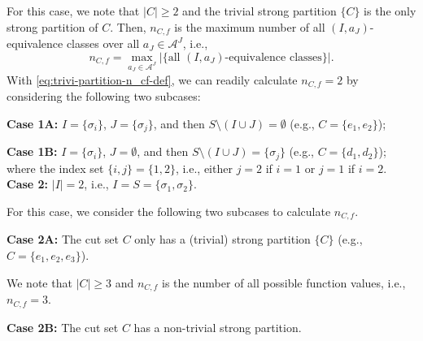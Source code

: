 \documentclass[11pt,draftclsnofoot,onecolumn]{IEEEtran}
\begin{document}
For this case, we note that $|C|\geq 2$ and  the trivial strong partition $\{C\}$ is the only strong partition of $C$.
Then, $n_{C,f}$ is the maximum number of all $(I,a_{J})$-equivalence classes over all $a_{J}\in\mathcal{A}^{J}$, i.e.,
\begin{equation}\label{eq:trivi-partition-n_cf-def}
 n_{C,f}=\max_{a_{J}\in\mathcal{A}^{J}}\big|\big\{\text{all $(I,a_{J})$-equivalence classes}\big\}\big|.
\end{equation}
With \eqref{eq:trivi-partition-n_cf-def}, we can readily calculate  $n_{C,f}=2$ by considering the following   two subcases:

\textbf{Case 1A:} $I=\{\sigma_{i}\}$, $J=\{\sigma_{j}\}$, and then $S\setminus(I\cup J)=\emptyset$ (e.g., $C=\{e_{1},e_{2}\}$);

\textbf{Case 1B:} $I=\{\sigma_{i}\}$, $J=\emptyset$, and then $S\setminus(I\cup J)=\{\sigma_{j}\}$ (e.g., $C=\{d_{1},d_{2}\}$);\\
where the index set $\{i,j\}=\{1,2\}$, i.e., either $j=2$ if $i=1$ or $j=1$ if $i=2$.\\
\textbf{Case 2:} $|I|=2$, i.e., $I=S=\{\sigma_{1},\sigma_{2}\}$.

For this case, we consider the following two subcases to calculate $n_{C,f}$.

\textbf{Case 2A:} The cut set $C$ only has a (trivial) strong partition $\{C\}$ (e.g., $C=\{e_{1},e_{2},e_{3}\}$).

 We note  that $|C|\geq 3$ and $n_{C,f}$ is the number of all possible function values, i.e., $n_{C,f}=3$.

\textbf{Case 2B:} The cut set $C$ has a non-trivial strong partition.
\end{document}
